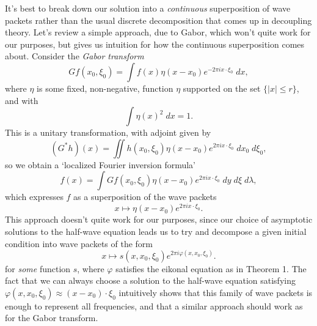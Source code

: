 \documentclass{article}
\theoremstyle{plain}
\theoremstyle{remark}
\theoremstyle{definition}
\begin{document}
It's best to break down our solution into a \emph{continuous} superposition of wave packets rather than the usual discrete decomposition that comes up in decoupling theory. Let's review a simple approach, due to Gabor, which won't quite work for our purposes, but gives us intuition for how the continuous superposition comes about. Consider the \emph{Gabor transform}
%
\[ Gf(x_0,\xi_0) = \int f(x) \eta(x - x_0) e^{- 2 \pi i x \cdot \xi_0}\; dx, \]
%
where $\eta$ is some fixed, non-negative, function $\eta$ supported on the set $\{ |x| \leq r \}$, and with
%
\[ \int \eta(x)^2\; dx = 1. \]
%
This is a unitary transformation, with adjoint given by
%
\[ (G^*h)(x) = \iint h(x_0,\xi_0) \eta(x - x_0) e^{2 \pi i x \cdot \xi_0}\; dx_0\; d\xi_0, \]
%
so we obtain a `localized Fourier inversion formula'
%
\[ f(x) = \int Gf(x_0,\xi_0) \eta(x - x_0) e^{2 \pi i x \cdot \xi_0}\; dy\; d\xi\; d\lambda, \]
%
which expresses $f$ as a superposition of the wave packets
%
\[ x \mapsto \eta(x - x_0) e^{2 \pi i x \cdot \xi_0}. \]
%
This approach doesn't quite work for our purposes, since our choice of asymptotic solutions to the half-wave equation leads us to try and decompose a given initial condition into wave packets of the form
%
\[ x \mapsto s(x,x_0,\xi_0) e^{2 \pi i \varphi(x,x_0, \xi_0)}. \]
%
for \emph{some} function $s$, where $\varphi$ satisfies the eikonal equation as in Theorem 1. The fact that we can always choose a solution to the half-wave equation satisfying $\varphi(x,x_0,\xi_0) \approx (x - x_0) \cdot \xi_0$ intuitively shows that this family of wave packets is enough to represent all frequencies, and that a similar approach should work as for the Gabor transform.
\end{document}
